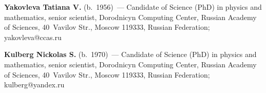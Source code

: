 \Contr


\noindent
\textbf{Yakovleva Tatiana V.} (b.\ 1956)~---
 Candidate of Science (PhD) in physics and mathematics, senior scientist,
 Dorodnicyn Computing Center, Russian Academy of Sciences,
 40~Vavilov Str., Moscow 119333, Russian Federation;
 yakovleva@ccas.ru

 \vspace*{3pt}

\noindent
\textbf{Kulberg Nickolas S.} (b.\ 1970)~--- Candidate of Science (PhD) in physics and
mathematics, senior scientist, Dorodnicyn Computing Center, Russian Academy of
Sciences, 40~Vavilov Str., Moscow 119333, Russian Federation;
kulberg@yandex.ru

\label{end\stat}

\renewcommand{\bibname}{\protect\rm Литература}